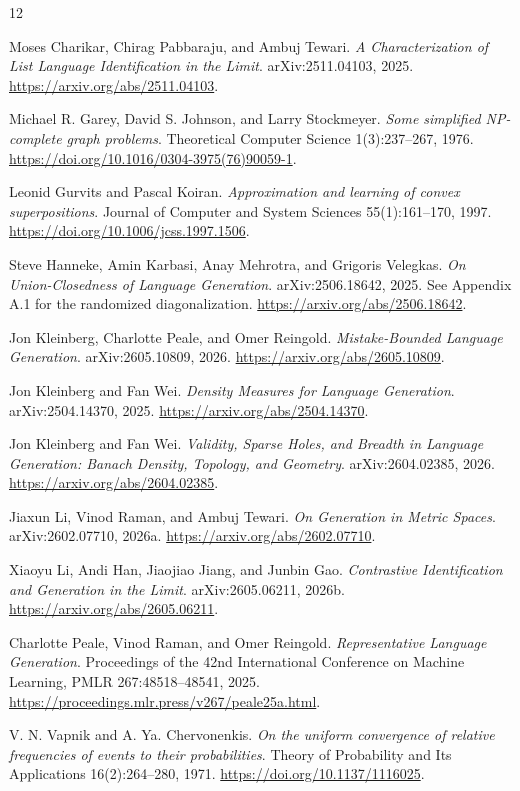 \begin{thebibliography}{12}
\raggedright
{} Moses Charikar, Chirag Pabbaraju, and Ambuj Tewari.
\emph{A Characterization of List Language Identification in the Limit}.
arXiv:2511.04103, 2025.
\url{https://arxiv.org/abs/2511.04103}.

 Michael R. Garey, David S. Johnson, and Larry Stockmeyer.
\emph{Some simplified NP-complete graph problems}.
Theoretical Computer Science 1(3):237--267, 1976.
\url{https://doi.org/10.1016/0304-3975(76)90059-1}.

 Leonid Gurvits and Pascal Koiran.
\emph{Approximation and learning of convex superpositions}.
Journal of Computer and System Sciences 55(1):161--170, 1997.
\url{https://doi.org/10.1006/jcss.1997.1506}.

 Steve Hanneke, Amin Karbasi, Anay Mehrotra, and Grigoris Velegkas.
\emph{On Union-Closedness of Language Generation}.
arXiv:2506.18642, 2025. See Appendix A.1 for the randomized diagonalization.
\url{https://arxiv.org/abs/2506.18642}.

 Jon Kleinberg, Charlotte Peale, and Omer Reingold.
\emph{Mistake-Bounded Language Generation}.
arXiv:2605.10809, 2026.
\url{https://arxiv.org/abs/2605.10809}.

 Jon Kleinberg and Fan Wei.
\emph{Density Measures for Language Generation}.
arXiv:2504.14370, 2025.
\url{https://arxiv.org/abs/2504.14370}.

 Jon Kleinberg and Fan Wei.
\emph{Validity, Sparse Holes, and Breadth in Language Generation: Banach Density, Topology, and Geometry}.
arXiv:2604.02385, 2026.
\url{https://arxiv.org/abs/2604.02385}.

 Jiaxun Li, Vinod Raman, and Ambuj Tewari.
\emph{On Generation in Metric Spaces}.
arXiv:2602.07710, 2026a.
\url{https://arxiv.org/abs/2602.07710}.

 Xiaoyu Li, Andi Han, Jiaojiao Jiang, and Junbin Gao.
\emph{Contrastive Identification and Generation in the Limit}.
arXiv:2605.06211, 2026b.
\url{https://arxiv.org/abs/2605.06211}.

 Charlotte Peale, Vinod Raman, and Omer Reingold.
\emph{Representative Language Generation}.
Proceedings of the 42nd International Conference on Machine Learning, PMLR 267:48518--48541, 2025.
\url{https://proceedings.mlr.press/v267/peale25a.html}.

 V. N. Vapnik and A. Ya. Chervonenkis.
\emph{On the uniform convergence of relative frequencies of events to their probabilities}.
Theory of Probability and Its Applications 16(2):264--280, 1971.
\url{https://doi.org/10.1137/1116025}.
\end{thebibliography}
